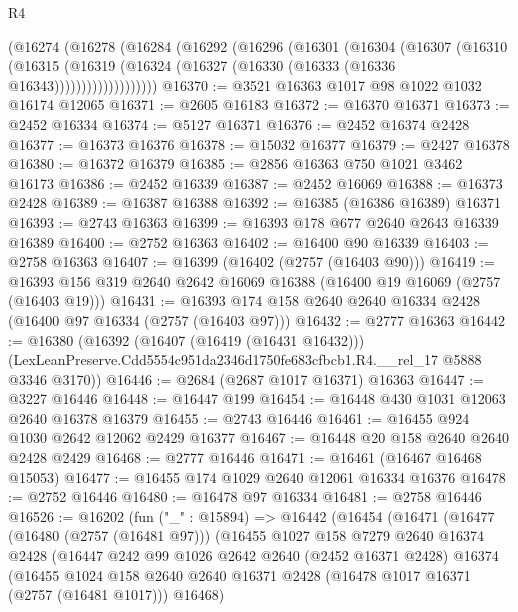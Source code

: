 \begin{lexlean}{R4}
\begin{coremodule}
          (@16274
            (@16278
              (@16284
                (@16292
                  (@16296
                    (@16301
                      (@16304
                        (@16307
                          (@16310
                            (@16315
                              (@16319
                                (@16324 (@16327 (@16330 (@16333 (@16336 @16343)))))))))))))))))))
@16370 := @3521 @16363 @1017 @98 @1022 @1032 @16174 @12065
@16371 := @2605 @16183
@16372 := @16370 @16371
@16373 := @2452 @16334
@16374 := @5127 @16371
@16376 := @2452 @16374 @2428
@16377 := @16373 @16376
@16378 := @15032 @16377
@16379 := @2427 @16378
@16380 := @16372 @16379
@16385 := @2856 @16363 @750 @1021 @3462 @16173
@16386 := @2452 @16339
@16387 := @2452 @16069
@16388 := @16373 @2428
@16389 := @16387 @16388
@16392 := @16385 (@16386 @16389) @16371
@16393 := @2743 @16363
@16399 := @16393 @178 @677 @2640 @2643 @16339 @16389
@16400 := @2752 @16363
@16402 := @16400 @90 @16339
@16403 := @2758 @16363
@16407 := @16399 (@16402 (@2757 (@16403 @90)))
@16419 := @16393 @156 @319 @2640 @2642 @16069 @16388 (@16400 @19 @16069 (@2757 (@16403 @19)))
@16431 := @16393 @174 @158 @2640 @2640 @16334 @2428 (@16400 @97 @16334 (@2757 (@16403 @97)))
@16432 := @2777 @16363
@16442 := @16380
    (@16392
      (@16407 (@16419 (@16431 @16432)))
      (LexLeanPreserve.Cdd5554c951da2346d1750fe683cfbcb1.R4.__rel_17 @5888 @3346 @3170))
@16446 := @2684 (@2687 @1017 @16371) @16363
@16447 := @3227 @16446
@16448 := @16447 @199
@16454 := @16448 @430 @1031 @12063 @2640 @16378 @16379
@16455 := @2743 @16446
@16461 := @16455 @924 @1030 @2642 @12062 @2429 @16377
@16467 := @16448 @20 @158 @2640 @2640 @2428 @2429
@16468 := @2777 @16446
@16471 := @16461 (@16467 @16468 @15053)
@16477 := @16455 @174 @1029 @2640 @12061 @16334 @16376
@16478 := @2752 @16446
@16480 := @16478 @97 @16334
@16481 := @2758 @16446
@16526 := @16202
    (fun ("_" : @15894) =>
    @16442
      (@16454
        (@16471
          (@16477
            (@16480 (@2757 (@16481 @97)))
            (@16455
              @1027
              @158
              @7279
              @2640
              @16374
              @2428
              (@16447
                @242
                @99
                @1026
                @2642
                @2640
                (@2452 @16371 @2428)
                @16374
                (@16455
                  @1024
                  @158
                  @2640
                  @2640
                  @16371
                  @2428
                  (@16478 @1017 @16371 (@2757 (@16481 @1017)))
                  @16468)

\end{coremodule}
\end{lexlean}

